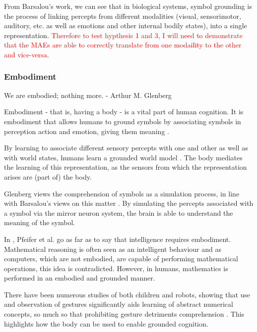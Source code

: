 From Barsalou's work, we can see that in biological systems, symbol grounding is the process of linking percepts from different modalities (visual, sensorimotor, auditory, etc. as well as emotions and other internal bodily states), into a single representation. \textcolor{red}{Therefore to test hypthesis 1 and 3, I will need to demonstrate that the \acp{MAE} are able to correctly translate from one modaility to the other and vice-versa.}

\subsubsection{Embodiment}
\label{sec:embodi}
\begin{displayquote}
We are embodied; nothing more. - Arthur M. Glenberg
\end{displayquote}
Embodiment - that is, having a body - is a vital part of human cognition. It is embodiment that allows humans to ground symbols by associating symbols in perception action and emotion, giving them meaning \cite{glenberg2015few}.

By learning to associate different sensory percepts with one and other as well as with world states, humans learn a grounded world model \cite{barsalou2008grounded}. The body mediates the learning of this representation, as the sensors from which the representation arises are (part of) the body. 

Glenberg \cite{glenberg2015few} views the comprehension of symbols as a simulation process, in line with Barsalou's views on this matter \cite{barsalou2008grounded}. By simulating the percepts associated with a symbol via the mirror neuron system, the brain is able to understand the meaning of the symbol.


In \cite{pfeifer2006body}, Pfeifer et al. go as far as to say that intelligence requires embodiment. Mathematical reasoning is often seen as an intelligent behaviour and as computers, which are not embodied, are capable of performing mathematical operations, this idea is contradicted. However, in humans, mathematics is performed in an embodied and grounded manner.  

There have been numerous studies of both children and robots, showing that use and observation of gestures significantly aids learning of abstract numerical concepts, so much so that prohibiting gesture detriments comprehension \cite{Goldin-MeadowSusan2015Fata, de2014making, rucinski2012robotic}. This highlights how the body can be used to enable grounded cognition.

